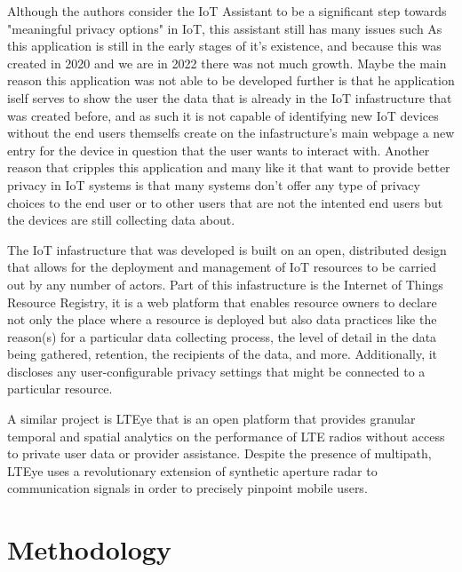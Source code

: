 \documentclass[conference]{IEEEtran}
\begin{document}
Although the authors consider the IoT Assistant to be a significant step towards
"meaningful privacy options" in IoT, this assistant still has many issues such As
this application is still in the early stages of it's existence, and because this was
created in 2020 and we are in 2022 there was not much growth. Maybe the main reason
this application was not able to be developed further is that he application iself
serves to show the user the data that is already in the IoT infastructure that was created before,
and as such it is not capable of identifying new IoT devices without the end users themselfs
create on the infastructure's main webpage \cite{DasPersonalized} a new entry for the device in question that the
user wants to interact with. Another reason that cripples this application and many like
it that want to provide better privacy in IoT systems is that many systems don't
offer any type of privacy choices to the end user or to other users that are not
the intented end users but the devices are still collecting data about.

The IoT infastructure that was developed \cite{DasPersonalized} is built on an open, distributed design
that allows for the deployment and management of IoT resources to be carried out
by any number of actors. Part of this infastructure is the Internet of Things Resource Registry,
it is a web platform that enables resource owners to declare not only the place where a
resource is deployed but also data practices like the reason(s) for a particular data collecting
process, the level of detail in the data being gathered, retention, the recipients of the data,
and more. Additionally, it discloses any user-configurable privacy settings that might be
connected to a particular resource.

A similar project is LTEye \cite{KumarLTE} that is an open
platform that provides granular temporal and spatial analytics on the performance of LTE
radios without access to private user data or provider assistance. Despite the presence of
multipath, LTEye uses a revolutionary extension of synthetic aperture radar to communication
signals in order to precisely pinpoint mobile users.

\section{Methodology}
\end{document}
